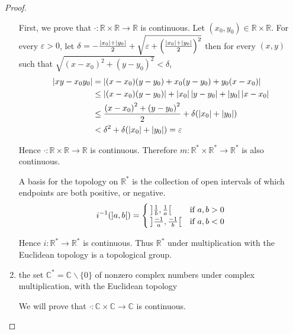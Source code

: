 \begin{proof}
\begin{enumerate}[label={(\alph*)}]
              First, we prove that $\cdot: \mathbb{R}\times\mathbb{R}\to\mathbb{R}$ is continuous. Let $(x_{0}, y_{0})\in\mathbb{R}\times\mathbb{R}$. For every $\varepsilon > 0$, let $\delta = -\frac{\left\vert{x_{0}}\right\vert+\left\vert{y_{0}}\right\vert}{2} + \sqrt{\varepsilon + {\left(\frac{\left\vert{x_{0}}\right\vert+\left\vert{y_{0}}\right\vert}{2}\right)}^{2}}$ then for every $(x, y)$ such that $\sqrt{{(x - x_{0})}^{2} + {(y - y_{0})}^{2}} < \delta$,
              \begin{align*}
                  \left\vert{xy - x_{0}y_{0}}\right\vert & = \left\vert{(x - x_{0})(y - y_{0}) + x_{0}(y - y_{0}) + y_{0}(x - x_{0})}\right\vert                        \\
                                        & \leq \left\vert{(x - x_{0})(y - y_{0})}\right\vert + \left\vert{x_{0}}\right\vert\left\vert{y - y_{0}}\right\vert + \left\vert{y_{0}}\right\vert\left\vert{x - x_{0}}\right\vert \\
                                        & \leq \frac{{(x - x_{0})}^{2} + {(y - y_{0})}^{2}}{2} + \delta(\left\vert{x_{0}}\right\vert + \left\vert{y_{0}}\right\vert)    \\
                                        & < \delta^{2} + \delta(\left\vert{x_{0}}\right\vert + \left\vert{y_{0}}\right\vert) = \varepsilon
              \end{align*}

              Hence $\cdot: \mathbb{R}\times\mathbb{R}\to \mathbb{R}$ is continuous. Therefore $m: \mathbb{R}^{*}\times\mathbb{R}^{*}\to \mathbb{R}^{*}$ is also continuous.

              A basis for the topology on $\mathbb{R}^{*}$ is the collection of open intervals of which endpoints are both positive, or negative.
              \[
                  i^{-1}(\left]{a, b}\right[) = \begin{cases}
                      \left]{\frac{1}{b}, \frac{1}{a}}\right[   & \text{if $a, b > 0$} \\
                      \left]{\frac{-1}{a}, \frac{-1}{b}}\right[ & \text{if $a, b < 0$}
                  \end{cases}
              \]

              Hence $i: \mathbb{R}^{*}\to \mathbb{R}^{*}$ is continuous. Thus $\mathbb{R}^{*}$ under multiplication with the Euclidean topology is a topological group.
        \item the set $\mathbb{C}^{*} = \mathbb{C}\smallsetminus\{0\}$ of nonzero complex numbers under complex multiplication, with the Euclidean topology

              We will prove that $\cdot: \mathbb{C}\times\mathbb{C}\to\mathbb{C}$ is continuous.


\end{enumerate}
\end{proof}
